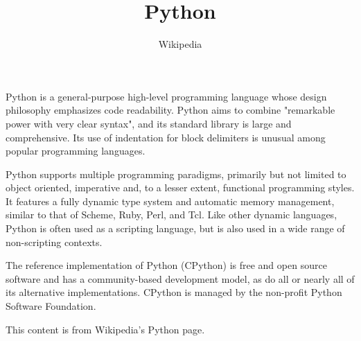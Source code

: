 \documentclass{article}
\title{Python}
\author{Wikipedia}
\begin{document}
Python is a general-purpose high-level programming language whose
design philosophy emphasizes code readability. Python aims to combine
"remarkable power with very clear syntax", and its standard library is
large and comprehensive. Its use of indentation for block delimiters
is unusual among popular programming languages.

Python supports multiple programming paradigms, primarily but not
limited to object oriented, imperative and, to a lesser extent,
functional programming styles. It features a fully dynamic type system
and automatic memory management, similar to that of Scheme, Ruby,
Perl, and Tcl. Like other dynamic languages, Python is often used as a
scripting language, but is also used in a wide range of non-scripting
contexts. 

The reference implementation of Python (CPython) is free and open
source software and has a community-based development model, as do all
or nearly all of its alternative implementations. CPython is managed
by the non-profit Python Software Foundation.

This content is from Wikipedia's Python page. 
\end{document}
